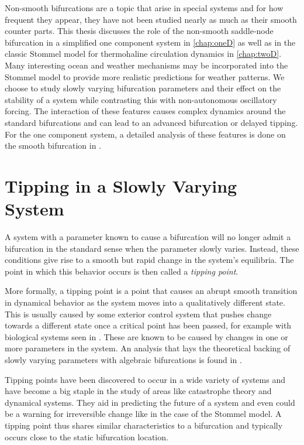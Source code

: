 \indent Non-smooth bifurcations are a topic that arise in special systems and for how frequent they appear, they have not been studied nearly as much as their smooth counter parts. This thesis discusses the role of the non-smooth saddle-node bifurcation in a simplified one component system in \autoref{chap:oneD} as well as in the classic Stommel model for thermohaline circulation dynamics in \autoref{chap:twoD}. Many interesting ocean and weather mechanisms may be incorporated into the Stommel model to provide more realistic predictions for weather patterns. We choose to study slowly varying bifurcation parameters and their effect on the stability of a system while contrasting this with non-autonomous oscillatory forcing. The interaction of these features causes complex dynamics around the standard bifurcations and can lead to an advanced bifurcation or delayed tipping. For the one component system, a detailed analysis of these features is done on the smooth bifurcation in \cite{zhu2015tipping}.

\section*{Tipping in a Slowly Varying System}
A system with a parameter known to cause a bifurcation will no longer admit a bifurcation in the standard sense when the parameter slowly varies. Instead, these conditions give rise to a smooth but rapid change in the system's equilibria. The point in which this behavior occurs is then called a \textit{tipping point}.

\indent More formally, a tipping point is a point that causes an abrupt smooth transition in dynamical behavior as the system moves into a qualitatively different state. This is usually caused by some exterior control system that pushes change towards a different state once a critical point has been passed, for example with biological systems seen in \cite{angeli2004detection}. These are known to be caused by changes in one or more parameters in the system. An analysis that lays the theoretical backing of slowly varying parameters with algebraic bifurcations is found in \cite{haberman1979slowly}.

\indent Tipping points have been discovered to occur in a wide variety of systems and have become a big staple in the study of areas like catastrophe theory and dynamical systems. They aid in predicting the future of a system and even could be a warning for irreversible change like in the case of the Stommel model. A tipping point thus shares similar characteristics to a bifurcation and typically occurs close to the static bifurcation location.

